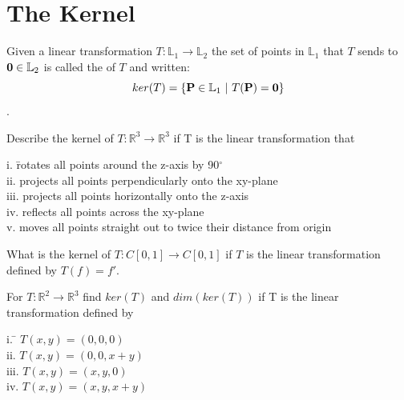 \vspace{.5cm}

\section{The Kernel}    \label{The Kernel}

\begin{defn}
	Given a linear transformation $T:\mathbb{L}_1 \longrightarrow \mathbb{L}_2 $ the set of points in $\mathbb{L}_1$ that $T$ sends to $\textbf{0} \in \mathbb{L}_2$ is called the  of $T$ and written:  
	\[ker(T)= \{ \textbf{P} \in \mathbb{L}_1  \ |\ T(\textbf{P}) = \textbf{0} \}  \]. 
\end{defn}

\begin{myexa}[\bd{a}]
	Describe the kernel of $T:\mathbb{R}^3 \longrightarrow \mathbb{R}^3$ if T is the linear transformation that 
		\begin{tabbing} 
				\indent i. \quad  \= rotates all points around the z-axis by 90$^\circ$ \\
				\indent ii. \> projects all points perpendicularly onto the xy-plane \\
				\indent iii.  \> projects all points horizontally onto the z-axis\\
				\indent iv.  \> reflects all points across the xy-plane \\
				\indent v.   \> moves all points straight out to twice their distance from origin
		\end{tabbing}  
\end{myexa}

\begin{myexb}[\bd{b}]
		What is the kernel of $T:C[0,1] \longrightarrow C[0,1]$ if $T$ is the linear transformation defined by $T(f) = f'$. 
\end{myexb}

\begin{myexc}[\bd{c}]
	For $T:\mathbb{R}^2 \longrightarrow \mathbb{R}^3$ find $ker(T)$ and $dim(ker(T))$ if T is the linear transformation defined by 
		\begin{tabbing} 
	\indent i. \quad  \= $T(x,y) = (0, 0, 0)$ \\
 	\indent ii. \> $T(x,y) = (0, 0 ,x+y)$ \\
	\indent iii.  \> $T(x,y) = (x,y,0)$ \\
	\indent iv.  \> $T(x,y) = (x, y, x+y)$ 
		\end{tabbing}  
\end{myexc}

